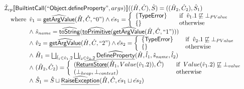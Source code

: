 \[\begin{array}{l}
\aI _{cp}\lbr \SF{BuiltintCall}(``\SF{Object.defineProperty}",args)\rbr((\hat{H},\hat{C}), \hat{S})
  = ((\hat{H}_2, \hat{C}_2), \hat{S}_1)\\
\quad\wherec{
  \hat{v}_1 =\ahf{getArgValue}(\hat{H}, \hat{C}, ``0")
  \land \hat{es}_1 =
    \left\{
    \begin{array}{l@{\quad\quad}l}
      \{ \SF{TypeError} \} & \ifc{\hat{v}_1.1 \not\sqsubseteq \bot_{PValue}}\\
      \{ \}& \owc\\
    \end{array}
    \right.\\
  \land\ \hat{s}_{name} = \ahf{toString}(\ahf{toPrimitive}(\ahf{getArgValue}(\hat{H}, \hat{C}, ``1")))\\
  \land\ \hat{v}_2 =\ahf{getArgValue}(\hat{H}, \hat{C}, ``2")
  \land \hat{es}_2 =
    \left\{
    \begin{array}{l@{\quad\quad}l}
      \{ \SF{TypeError} \} & \ifc{\hat{v}_2.1 \not\sqsubseteq \bot_{PValue}}\\
      \{ \}& \owc\\
    \end{array}
    \right.\\
  \land\ \hat{H}_1 = \bigsqcup_{\hat{l}_1 \in \hat{v}_1.2} \bigsqcup_{\hat{l}_2 \in \hat{v}_2.2}
    \ahf{DefineProperty}(\hat{H}, \hat{l}_1, \hat{s}_{name}, \hat{l}_2)\\
  \land\ (\hat{H}_2, \hat{C}_2) = 
    \left\{\begin{array}{l@{\quad\quad}l}
      (\ahf{ReturnStore}(\hat{H}_1, Value(\hat{v}_1.2)), \hat{C})
      & \ifc{Value(\hat{v}_1.2) \not\sqsubseteq \bot_{value}}\\
      (\bot_{heap}, \bot_{context}) & \owc \\
    \end{array}\right.\\
  \land\ \hat{S}_1 = \hat{S} \sqcup \ahf{RaiseException}(\hat{H}, \hat{C}, \hat{es}_1 \sqcup \hat{es}_2)\\
  }\\
\\\\ 


\end{array}\]
